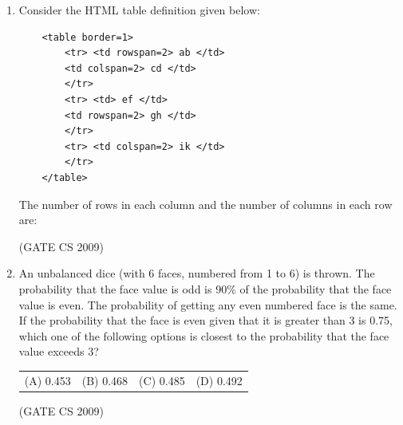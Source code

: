 \documentclass[a4paper, 11pt]{article}
\begin{document}
\begin{enumerate}
    \item Consider the HTML table definition given below:
    \begin{lstlisting}
    <table border=1>
        <tr> <td rowspan=2> ab </td>
        <td colspan=2> cd </td>
        </tr>
        <tr> <td> ef </td>
        <td rowspan=2> gh </td>
        </tr>
        <tr> <td colspan=2> ik </td>
        </tr>
    </table>
    \end{lstlisting}
    The number of rows in each column and the number of columns in each row are:\\ 
    \begin{enumerate}
    \end{enumerate}

    \hfill (GATE CS 2009)

    \item An unbalanced dice (with 6 faces, numbered from 1 to 6) is thrown. The probability that the face value is odd is 90\% of the probability that the face value is even. The probability of getting any even numbered face is the same.\\
    If the probability that the face is even given that it is greater than 3 is 0.75, which one of the following options is closest to the probability that the face value exceeds 3?\\
    \begin{tabularx}{\textwidth}{@{}XXXX@{}}
    (A) 0.453 & (B) 0.468 & (C) 0.485 & (D) 0.492
    \end{tabularx}
        \begin{enumerate}
    \end{enumerate}


    \hfill (GATE CS 2009)


\end{enumerate}
\end{document}
